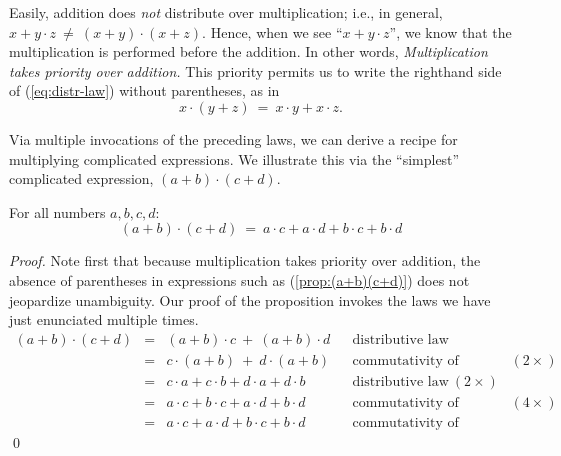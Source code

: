 Easily, addition does {\em not} distribute over multiplication; i.e.,
in general, $x + y \cdot z \ \neq \ (x+y) \cdot (x+z)$.  Hence, when
we see ``$x + y \cdot z$'', we know that the multiplication is
performed before the addition.  In other words, {\em Multiplication
  takes priority over addition.}   This priority permits us to write the
righthand side of (\ref{eq:distr-law}) without parentheses, as in
\[ x \cdot (y + z) \ = \ x \cdot y + x \cdot z. \]

Via multiple invocations of the preceding laws, we can derive a recipe
for multiplying complicated expressions.  We illustrate this via the
``simplest'' complicated expression, $(a+b) \cdot (c+d)$.

\begin{prop}
\label{prop:(a+b)(c+d)}
For all numbers $a, b, c, d$:
\begin{equation}
\label{eq:(a+b)(c+d)}
(a+b) \cdot (c+d) \ = \ a \cdot c + a \cdot d + b \cdot c + b \cdot d
\end{equation}
\end{prop}

\begin{proof}
Note first that because multiplication takes priority over addition,
the absence of parentheses in expressions such as
(\ref{prop:(a+b)(c+d)}) does not jeopardize unambiguity.  Our proof of
the proposition invokes the laws we have just enunciated multiple
times.
\[
\begin{array}{lclll}
(a+b) \cdot (c+d) & = & (a+b) \cdot c \ + \ (a+b) \cdot d
& & \mbox{distributive law} \\ 
  & = & c \cdot (a+b) \ + \ d \cdot (a+b)
& & \mbox{commutativity of multiplication} \ (2 \times) \\
  & = & c \cdot a + c \cdot b + d \cdot a + d \cdot b 
& & \mbox{distributive law} \ (2 \times) \\
  & = & a \cdot c + b \cdot c + a \cdot d + b \cdot d
& & \mbox{commutativity of multiplication} \ (4 \times) \\
  & = &  a \cdot c + a \cdot d + b \cdot c + b \cdot d
& & \mbox{commutativity of addition}
\end{array}
\]
\qed
\end{proof}


